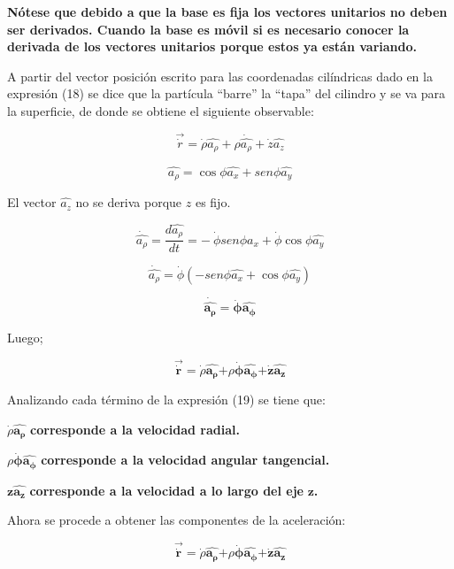 \documentclass[]{article}
\begin{document}
\textbf{Nótese que debido a que la base es fija los vectores unitarios
no deben ser derivados. Cuando la base es móvil si es necesario conocer
la derivada de los vectores unitarios porque estos ya están variando.}

A partir del vector posición escrito para las coordenadas cilíndricas
dado en la expresión (18) se dice que la partícula ``barre'' la ``tapa''
del cilindro y se va para la superficie, de donde se obtiene el
siguiente observable:

\[\overrightarrow{\dot{r}} = \dot{\rho}\widehat{a_{\rho}} + \rho\dot{\widehat{a_{\rho}}} + \dot{z}\widehat{a_{z}}\]

\[\widehat{a_{\rho}} = \cos\phi\widehat{a_{x}} + {sen}\phi\widehat{a_{y}}\]

El vector \(\widehat{a_{z}}\) no se deriva porque \(z\) es fijo.

\[\dot{\widehat{a_{\rho}}} = \frac{d\widehat{a_{\rho}}}{dt} = - \ \dot{\phi}{sen}\phi\widehat{a_{x}} + \dot{\phi}\cos\phi\widehat{a_{y}}\]

\[\dot{\widehat{a_{\rho}}} = \dot{\phi}( - {sen}\phi\widehat{a_{x}} + \cos\phi\widehat{a_{y}})\]

\[\dot{\widehat{\mathbf{a}_{\mathbf{\rho}}}}\mathbf{=}\dot{\mathbf{\phi}}\widehat{\mathbf{a}_{\mathbf{\phi}}}\]

Luego;

\[\overrightarrow{\dot{\mathbf{r}}}\mathbf{=}\dot{\rho}\widehat{\mathbf{a}_{\mathbf{\rho}}}\mathbf{+}\rho\dot{\mathbf{\phi}}\widehat{\mathbf{a}_{\mathbf{\phi}}}\mathbf{+}\dot{\mathbf{z}}\widehat{\mathbf{a}_{\mathbf{z}}}\]

Analizando cada término de la expresión (19) se tiene que:

\(\dot{\rho}\widehat{\mathbf{a}_{\mathbf{\rho}}}\) \textbf{corresponde a
la velocidad radial.}

\(\rho\dot{\mathbf{\phi}}\widehat{\mathbf{a}_{\mathbf{\phi}}}\)
\textbf{corresponde a la velocidad angular tangencial.}

\(\mathbf{z}\widehat{\mathbf{a}_{\mathbf{z}}}\) \textbf{corresponde a la
velocidad a lo largo del eje} \(\mathbf{z}\)\textbf{.}

Ahora se procede a obtener las componentes de la aceleración:

\[\overrightarrow{\dot{\mathbf{r}}}\mathbf{=}\dot{\rho}\widehat{\mathbf{a}_{\mathbf{\rho}}}\mathbf{+}\rho\dot{\mathbf{\phi}}\widehat{\mathbf{a}_{\mathbf{\phi}}}\mathbf{+}\dot{\mathbf{z}}\widehat{\mathbf{a}_{\mathbf{z}}}\]
\end{document}
